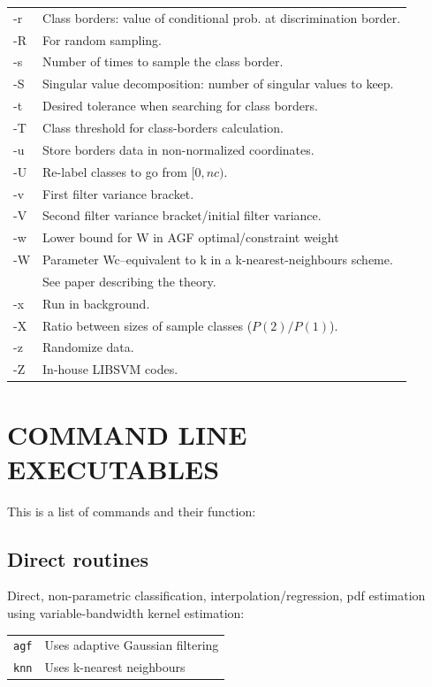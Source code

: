 \documentclass[12pt]{article}
\begin{document}
\begin{tabular}{ll}
-r & Class borders: value of conditional prob. at discrimination border.\\
-R & For random sampling.\\
-s & Number of times to sample the class border.\\
-S & Singular value decomposition: number of singular values to keep.\\
-t & Desired tolerance when searching for class borders.\\
-T & Class threshold for class-borders calculation.\\
-u & Store borders data in non-normalized coordinates.\\
-U & Re-label classes to go from $[0, nc)$.\\
-v & First filter variance bracket.\\
-V & Second filter variance bracket/initial filter variance.\\
-w & Lower bound for W in AGF optimal/constraint weight\\
-W & Parameter Wc--equivalent to k in a k-nearest-neighbours scheme.\\
  & See paper describing the theory.\\
-x & Run in background.\\
-X & Ratio between sizes of sample classes ($P(2)/P(1)$).\\
-z & Randomize data.\\
-Z & In-house LIBSVM codes.
\end{tabular}

\section{COMMAND LINE EXECUTABLES}

\label{COMMAND_LINE_EXECUTABLES}

This is a list of commands and their function:

\subsection{Direct routines}

Direct, non-parametric classification, interpolation/regression, pdf estimation using variable-bandwidth kernel estimation:

\begin{tabular}{ll}
\verb/agf/ & Uses adaptive Gaussian filtering\\
\verb/knn/ & Uses k-nearest neighbours
\end{tabular}
\end{document}
